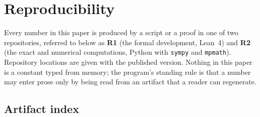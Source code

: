 \section{Reproducibility}\label{sec:reproducibility}

Every number in this paper is produced by a script or a proof in one of two
repositories, referred to below as \textbf{R1} (the formal development, Lean~4)
and \textbf{R2} (the exact and numerical computations, Python with
\texttt{sympy} and \texttt{mpmath}). Repository locations are given with the
published version. Nothing in this paper is a constant typed from memory; the
program's standing rule is that a number may enter prose only by being read
from an artifact that a reader can regenerate.

\subsection{Artifact index}

